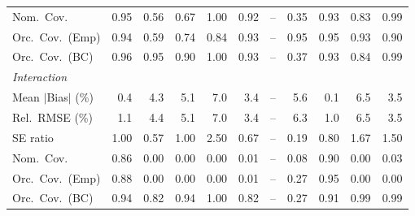 \begin{table}[!htbp]
{\begin{tabular}{lrrrrrrrrrr}
\quad Nom.\ Cov. & \cellcolor{rankone}0.95 & 0.56 & 0.67 & 1.00 & \cellcolor{rankthree}0.92 & -- & 0.35 & \cellcolor{ranktwo}0.93 & 0.83 & 0.99 \\
\quad Orc.\ Cov.\ (Emp) & \cellcolor{rankthree}0.94 & 0.59 & 0.74 & 0.84 & 0.93 & -- & \cellcolor{ranktwo}0.95 & \cellcolor{rankone}0.95 & 0.93 & 0.90 \\
\quad Orc.\ Cov.\ (BC) & \cellcolor{ranktwo}0.96 & \cellcolor{rankone}0.95 & 0.90 & 1.00 & 0.93 & -- & 0.37 & \cellcolor{rankthree}0.93 & 0.84 & 0.99 \\
\midrule
\multicolumn{11}{l}{\textit{Interaction}} \\[2pt]
\quad Mean $|$Bias$|$ (\%) & \cellcolor{ranktwo}0.4 & 4.3 & 5.1 & 7.0 & \cellcolor{rankthree}3.4 & -- & 5.6 & \cellcolor{rankone}0.1 & 6.5 & 3.5 \\
\quad Rel.\ RMSE (\%) & \cellcolor{ranktwo}1.1 & 4.4 & 5.1 & 7.0 & \cellcolor{rankthree}3.4 & -- & 6.3 & \cellcolor{rankone}1.0 & 6.5 & 3.5 \\
\quad SE ratio & \cellcolor{rankone}1.00 & 0.57 & \cellcolor{ranktwo}1.00 & 2.50 & 0.67 & -- & 0.19 & \cellcolor{rankthree}0.80 & 1.67 & 1.50 \\
\quad Nom.\ Cov. & \cellcolor{ranktwo}0.86 & 0.00 & 0.00 & 0.00 & 0.01 & -- & \cellcolor{rankthree}0.08 & \cellcolor{rankone}0.90 & 0.00 & 0.03 \\
\quad Orc.\ Cov.\ (Emp) & \cellcolor{ranktwo}0.88 & 0.00 & 0.00 & 0.00 & 0.01 & -- & \cellcolor{rankthree}0.27 & \cellcolor{rankone}0.95 & 0.00 & 0.00 \\
\quad Orc.\ Cov.\ (BC) & \cellcolor{rankone}0.94 & 0.82 & \cellcolor{ranktwo}0.94 & 1.00 & 0.82 & -- & 0.27 & 0.91 & 0.99 & \cellcolor{rankthree}0.99 \\
\bottomrule
\end{tabular}}
\end{table}
